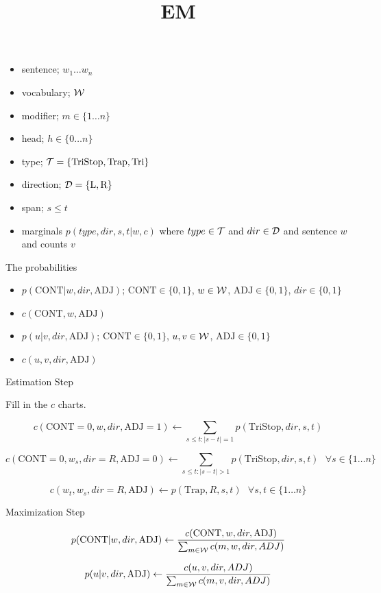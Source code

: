 \documentclass{article}
\title{EM }
\begin{document}
\date{}
\maketitle{}

\begin{itemize}
\item sentence; $w_1 \ldots w_n$
\item vocabulary; ${\cal W}$
\item modifier; $m \in \{1 \ldots n\}$
\item head; $h \in \{0 \ldots n\}$
\item type; ${\cal T}= \{\textrm{TriStop}, \textrm{Trap},  \textrm{Tri}\}$
\item direction; ${\cal D}= \{\textrm{L}, \textrm{R}\}$
\item span; $s \leq t$
\item marginals $p(type, dir, s, t | w, c)$ where $type \in {\cal T}$ and $dir \in {\cal D}$ and sentence $w$ and counts $v$
\end{itemize}


The probabilities 

\begin{itemize}
\item $p(\mathrm{CONT} | w, dir, \mathrm{ADJ})$; $\mathrm{CONT} \in \{0, 1\}$,  $w \in {\cal W}$, $\mathrm{ADJ} \in \{0, 1\}$, $dir \in \{0,1\}$
\item $c(\mathrm{CONT}, w, \mathrm{ADJ})$
\item $p(u | v, dir, \mathrm{ADJ})$; $\mathrm{CONT} \in \{0, 1\}$,  $u, v \in {\cal W}$, $\mathrm{ADJ} \in \{0, 1\}$
\item $c(u, v, dir, \mathrm{ADJ})$

\end{itemize}



Estimation Step


Fill in the $c$ charts. 



 \[c(\mathrm{CONT} = 0, w, dir, \mathrm{ADJ}= 1) \gets 
  \sum_{s \leq t: |s -t| = 1} p(\mathrm{TriStop}, dir, s, t) \]

 \[c(\mathrm{CONT} = 0, w_s, dir=R, \mathrm{ADJ}= 0) \gets 
  \sum_{s \leq t: |s -t| > 1} p(\mathrm{TriStop}, dir, s, t) \ \ \ \forall s \in \{1 \ldots n\}\]

\[c(w_t, w_s, dir=R, \mathrm{ADJ}) \gets p(\mathrm{Trap}, R, s, t) \ \ \ \forall s,t \in \{1 \ldots n\} \]


Maximization Step

  \[p(\mathrm{CONT} | w, dir, \mathrm{ADJ}) \gets 
  \frac{c(\mathrm{CONT}, w, dir, \mathrm{ADJ})}{
    \sum_{m \in {\cal W}} c(m, w, dir, ADJ)}
  \]



  \[p(u | v, dir, \mathrm{ADJ}) \gets 
  \frac{c(u, v, dir, ADJ)}{
    \sum_{m \in {\cal W}} c(m, v, dir, ADJ)}
  \]
\end{document}

